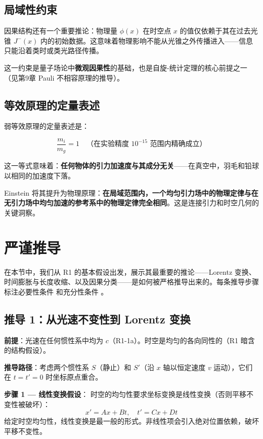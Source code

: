 \subsection{局域性约束}

因果结构还有一个重要推论：物理量 $\phi(x)$ 在时空点 $x$ 的值仅依赖于其在过去光锥 $J^-(x)$ 内的初始数据。这意味着物理影响不能从光锥之外传播进入——信息只能沿着类时或类光路径传播。

这一约束是量子场论中\textbf{微观因果性}的基础，也是自旋-统计定理的核心前提之一（见第9章 Pauli 不相容原理的推导）。

\subsection{等效原理的定量表述}

弱等效原理的定量表述是：

\begin{equation}
\frac{m_i}{m_g} = 1 \quad \text{（在实验精度 $10^{-15}$ 范围内精确成立）}
\end{equation}

\noindent 这一等式意味着：\textbf{任何物体的引力加速度与其成分无关}——在真空中，羽毛和铅球以相同的加速度下落。

Einstein 将其提升为物理原理：\textbf{在局域范围内，一个均匀引力场中的物理定律与在无引力场中均匀加速的参考系中的物理定律完全相同}。这是连接引力和时空几何的关键洞察。

\section{严谨推导}

在本节中，我们从 R1 的基本假设出发，展示其最重要的推论——Lorentz 变换、时间膨胀与长度收缩、以及因果分类——是如何被严格推导出来的。每条推导步骤标注必要性条件 \fbox{[N]} 和充分性条件 \fbox{[S]}。

\subsection{推导 1：从光速不变性到 Lorentz 变换}

\textbf{前提}：光速在任何惯性系中均为 $c$（R1-1a）。时空是均匀的各向同性的（R1 暗含的结构假设）。

\textbf{推导路径}：考虑两个惯性系 $S$（静止）和 $S'$（沿 $x$ 轴以恒定速度 $v$ 运动），它们在 $t = t' = 0$ 时坐标原点重合。

\textbf{步骤 1 — 线性变换假设}：\fbox{[N]} 时空的均匀性要求坐标变换是线性变换（否则平移不变性被破坏）：
\begin{equation}
x' = A x + B t, \quad t' = C x + D t
\end{equation}
\fbox{[S]} 给定时空均匀性，线性变换是最一般的形式。非线性项会引入绝对位置依赖，破坏平移不变性。

